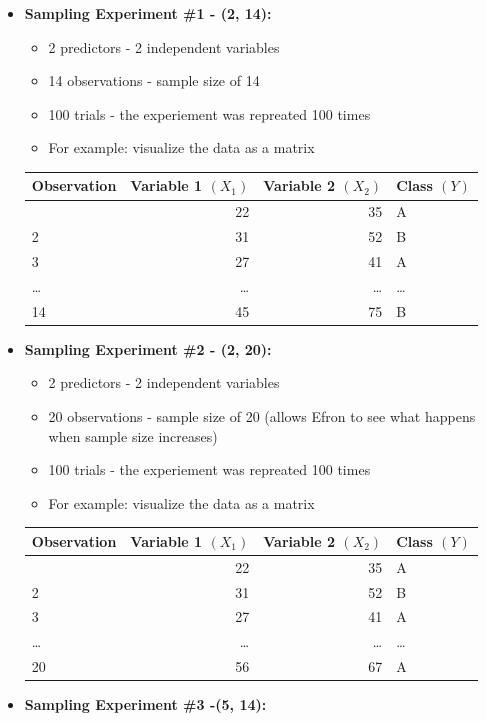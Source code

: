 \documentclass[
  letterpaper,
  DIV=11,
  numbers=noendperiod]{scrreprt}
\newcounter{none} %
\providecommand{\tightlist}{%
  \setlength{\itemsep}{0pt}\setlength{\parskip}{0pt}}
\begin{document}
\begin{itemize}
\tightlist
\item
  \textbf{Sampling Experiment \#1 - (2, 14):}

  \begin{itemize}
  \tightlist
  \item
    2 predictors - 2 independent variables
  \item
    14 observations - sample size of 14
  \item
    100 trials - the experiement was repreated 100 times
  \item
    For example: visualize the data as a matrix
  \end{itemize}

  {\def\LTcaptype{none} %
  \begin{longtable}[]{@{}lrrl@{}}
  \toprule\noalign{}
  Observation & Variable 1 \((X_1)\) & Variable 2 \((X_2)\) & Class
  \((Y)\) \\
  \midrule\noalign{}
  \endhead
  \bottomrule\noalign{}
  \endlastfoot
  1 & 22 & 35 & A \\
  2 & 31 & 52 & B \\
  3 & 27 & 41 & A \\
  \ldots{} & \ldots{} & \ldots{} & \ldots{} \\
  14 & 45 & 75 & B \\
  \end{longtable}
  }
\item
  \textbf{Sampling Experiment \#2 - (2, 20):}

  \begin{itemize}
  \tightlist
  \item
    2 predictors - 2 independent variables
  \item
    20 observations - sample size of 20 (allows Efron to see what
    happens when sample size increases)
  \item
    100 trials - the experiement was repreated 100 times
  \item
    For example: visualize the data as a matrix
  \end{itemize}

  {\def\LTcaptype{none} %
  \begin{longtable}[]{@{}lrrl@{}}
  \toprule\noalign{}
  Observation & Variable 1 \((X_1)\) & Variable 2 \((X_2)\) & Class
  \((Y)\) \\
  \midrule\noalign{}
  \endhead
  \bottomrule\noalign{}
  \endlastfoot
  1 & 22 & 35 & A \\
  2 & 31 & 52 & B \\
  3 & 27 & 41 & A \\
  \ldots{} & \ldots{} & \ldots{} & \ldots{} \\
  20 & 56 & 67 & A \\
  \end{longtable}
  }
\item
  \textbf{Sampling Experiment \#3 -(5, 14):}


\end{itemize}
\end{document}
